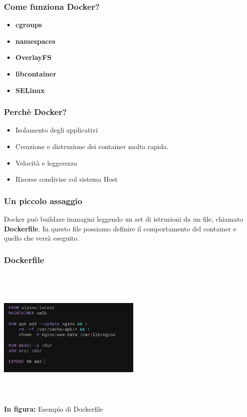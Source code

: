 \documentclass{beamer}
\begin{document}

\begin{frame}
    \frametitle{Come funziona Docker?} 
    \begin{itemize}
        \item<1-> \textbf{cgroups}
        \item<2-> \textbf{namespaces}
        \item<3-> \textbf{OverlayFS}
        \item<4-> \textbf{libcontainer}
        \item<5-> \textbf{SELinux}
    \end{itemize}
\end{frame}


\begin{frame}
    \frametitle{Perch\`e Docker?}
    \begin{itemize}
        \item<1-> Isolamento degli applicativi
        \item<2-> Creazione e distruzione dei container molto rapida. 
        \item<3-> Velocit\`a e leggerezza
        \item<4-> Risorse condivise col sistema Host
    \end{itemize}
\end{frame}


\begin{frame}
    \frametitle{Un piccolo assaggio}
    Docker pu\`o buildare immagini leggendo un set di istruzioni da un file, chiamato \textbf{Dockerfile}.
    In questo file possiamo definire il comportamento del container e quello che verr\`a eseguito.
    
\end{frame}


\begin{frame}
    \frametitle{Dockerfile}
    \begin{center}
        \includegraphics[width=7cm,height=7cm,keepaspectratio]{dockerfile.png}
        \\ \textbf{In figura:} Esempio di Dockerfile
    \end{center}
\end{frame}
\end{document}
